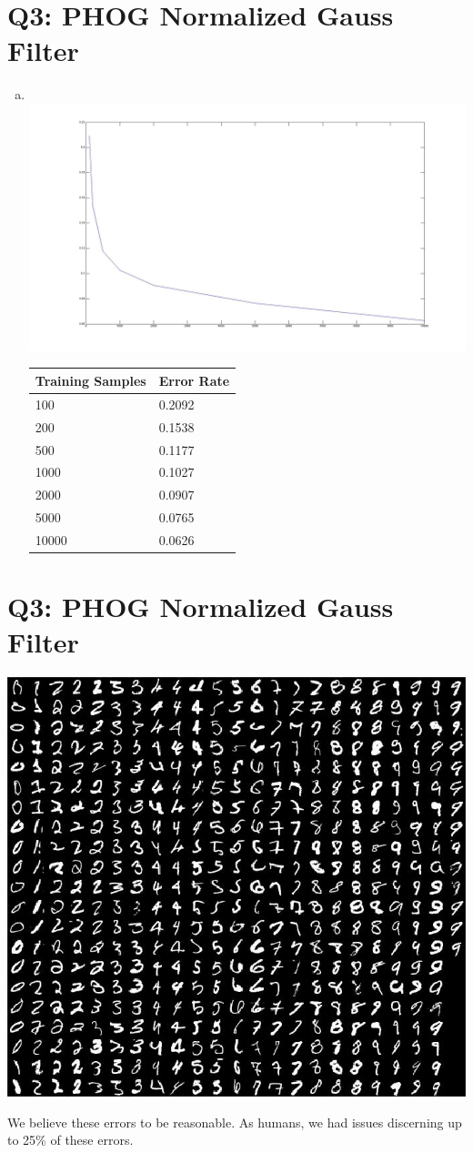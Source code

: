 \documentclass[12pt]{article}
\begin{document}
\section*{Q3: PHOG Normalized Gauss Filter}
  \begin{enumerate}[d.]
    \item \quad \\
      \includegraphics[scale=0.3]{q3_normalized_gauss.jpg}
      \begin{tabular}{l|l}
        \hline
        Training Samples & Error Rate \\
        \hline
        100   & 0.2092 \\
        200   & 0.1538 \\
        500   & 0.1177 \\
        1000  & 0.1027 \\
        2000  & 0.0907 \\
        5000  & 0.0765 \\
        10000 & 0.0626 \\
      \end{tabular}
  \end{enumerate}

\newpage
\section*{Q3: PHOG Normalized Gauss Filter}
  \begin{center}
  \includegraphics[scale=0.75]{q4_phog_normalized_err.jpg}
  \end{center}
  We believe these errors to be reasonable. 
  As humans, we had issues discerning up to 25\% of these errors.
 
  
\end{document}
